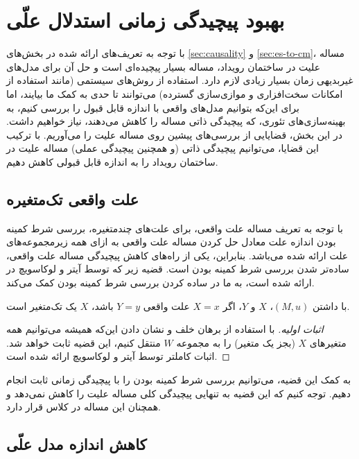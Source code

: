 \section{بهبود پیچیدگی زمانی استدلال علّی}\label{sec:improvements}

با توجه به تعریف‌های ارائه شده در بخش‌های
\ref{sec:causality} و \ref{sec:es-to-cm}،
مساله علیت در ساختمان رویداد، مساله بسیار پیچیده‌ای است
و حل آن برای مدل‌های غیربدیهی زمان بسیار زیادی لازم دارد.
استفاده از روش‌های سیستمی
(مانند استفاده از امکانات سخت‌افزاری
و موازی‌سازی
گسترده)
می‌توانند تا حدی به کمک ما بیایند،
اما برای این‌که بتوانیم مدل‌های واقعی
با اندازه قابل قبول را بررسی کنیم،
به بهینه‌سازی‌های تئوری، که پیچیدگی ذاتی مساله را کاهش می‌دهند،
نیاز خواهیم داشت. در این بخش،
قضایایی از بررسی‌های پیشین روی مساله علیت را می‌آوریم.
با ترکیب این قضایا، می‌توانیم پیچیدگی ذاتی
(و همچنین پیچیدگی عملی)
مساله علیت در
ساختمان رویداد را به اندازه قابل قبولی کاهش دهیم.

\subsection{علت واقعی تک‌متغیره}
با توجه به تعریف مساله علت واقعی،
برای علت‌های چندمتغیره، بررسی شرط کمینه بودن
اندازه علت معادل حل کردن مساله علت واقعی به ازای
همه زیرمجموعه‌های علت ارائه شده می‌باشد.
بنابراین، یکی از راه‌های کاهش پیچیدگی مساله علت واقعی،
ساده‌تر شدن بررسی شرط کمینه بودن است.
قضیه زیر که توسط آیتر و لوکاسویچ در
\cite{eiter2001complexity}
ارائه شده است، به ما در ساده کردن
بررسی شرط کمینه بودن کمک می‌کند.

\begin{theorem}\label{thm:causality-singleton}
  با داشتن
  $(M,u)$،
  $X$ و $Y$،
  اگر
  $X=x$
  علت واقعی
  $Y=y$ باشد،
  $X$
  یک تک‌متغیر است.
\end{theorem}

\begin{proof}[اثبات اولیه]
  با استفاده از برهان خلف و نشان دادن این‌که همیشه
  می‌توانیم همه متغیرهای
  $X$
  (بجز یک متغیر)
  را به مجموعه
  $W$
  منتقل کنیم، این قضیه ثابت خواهد شد.
  اثبات کاملتر توسط آیتر و لوکاسویچ ارائه شده است.
\end{proof}

به کمک این قضیه، می‌توانیم بررسی شرط کمینه بودن را
با پیچیدگی زمانی ثابت انجام دهیم.
توجه کنیم که این قضیه به تنهایی پیچیدگی کلی
مساله علیت را کاهش نمی‌دهد و همچنان این مساله در کلاس
قرار دارد.

\subsection{کاهش اندازه مدل علّی}

